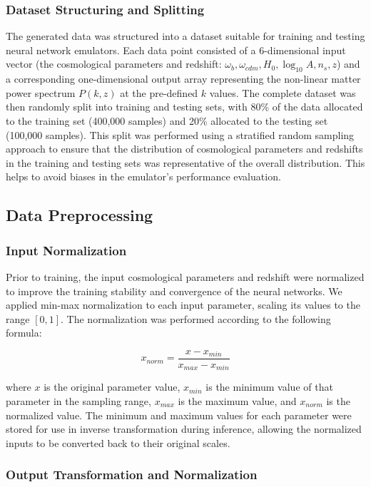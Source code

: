 \documentclass[twocolumn]{aastex631}
\begin{document}
\subsubsection{Dataset Structuring and Splitting}

The generated data was structured into a dataset suitable for training and testing neural network emulators. Each data point consisted of a 6-dimensional input vector (the cosmological parameters and redshift: $\omega_b, \omega_{cdm}, H_0, \log_{10} A, n_s, z$) and a corresponding one-dimensional output array representing the non-linear matter power spectrum $P(k, z)$ at the pre-defined $k$ values. The complete dataset was then randomly split into training and testing sets, with 80\% of the data allocated to the training set (400,000 samples) and 20\% allocated to the testing set (100,000 samples). This split was performed using a stratified random sampling approach to ensure that the distribution of cosmological parameters and redshifts in the training and testing sets was representative of the overall distribution. This helps to avoid biases in the emulator's performance evaluation.

\subsection{Data Preprocessing}

\subsubsection{Input Normalization}

Prior to training, the input cosmological parameters and redshift were normalized to improve the training stability and convergence of the neural networks. We applied min-max normalization to each input parameter, scaling its values to the range $[0, 1]$. The normalization was performed according to the following formula:

$$x_{norm} = \frac{x - x_{min}}{x_{max} - x_{min}}$$

where $x$ is the original parameter value, $x_{min}$ is the minimum value of that parameter in the sampling range, $x_{max}$ is the maximum value, and $x_{norm}$ is the normalized value. The minimum and maximum values for each parameter were stored for use in inverse transformation during inference, allowing the normalized inputs to be converted back to their original scales.

\subsubsection{Output Transformation and Normalization}
\end{document}
